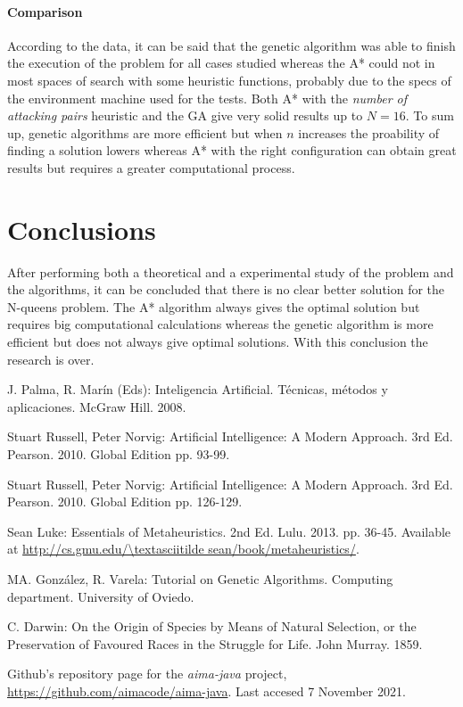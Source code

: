 \documentclass[]{llncs}
\begin{document}
\paragraph{Comparison}
According to the data, it can be said that the genetic algorithm was able to finish the execution of the problem for all cases studied whereas the A* could not in most spaces of search with some heuristic functions, probably due to the specs of the environment machine used for the tests. Both A* with the \textit{number of attacking pairs} heuristic and the GA give very solid results up to $N=16$. To sum up, genetic algorithms are more efficient but when $n$ increases the proability of finding a solution lowers whereas A* with the right configuration can obtain great results but requires a greater computational process.

\section{Conclusions}\label{conclusions}
After performing both a theoretical and a experimental study of the problem and the algorithms, it can be concluded that there is no clear better solution for the N-queens problem. The A* algorithm always gives the optimal solution but requires big computational calculations whereas the genetic algorithm is more efficient but does not always give optimal solutions. With this conclusion the research is over.
\begin{thebibliography}{8}
        J. Palma, R. Marín (Eds): Inteligencia Artificial. Técnicas, métodos y aplicaciones. McGraw Hill. 2008.

        Stuart Russell, Peter Norvig: Artificial Intelligence: A Modern Approach. 3rd Ed. Pearson. 2010. Global Edition pp. 93-99.

        Stuart Russell, Peter Norvig: Artificial Intelligence: A Modern Approach. 3rd Ed. Pearson. 2010. Global Edition pp. 126-129.

        Sean Luke: Essentials of Metaheuristics. 2nd Ed. Lulu. 2013. pp. 36-45. Available at \url{http://cs.gmu.edu/\textasciitilde sean/book/metaheuristics/}.

        MA. González, R. Varela: Tutorial on Genetic Algorithms. Computing department. University of Oviedo.

        C. Darwin: On the Origin of Species by Means of Natural Selection, or the Preservation of Favoured Races in the Struggle for Life. John Murray. 1859.

        Github's repository page for the \textit{aima-java} project, \url{https://github.com/aimacode/aima-java}. Last accesed 7 November 2021.
\end{thebibliography}
\end{document}
